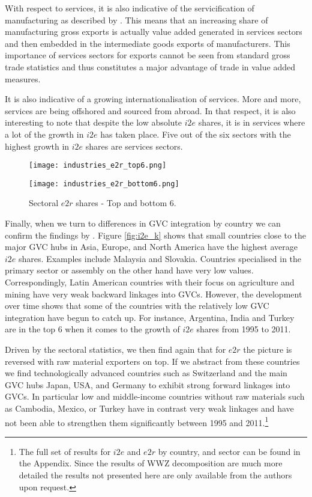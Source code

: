 \documentclass[11pt,a4paper]{article}
\begin{document}
With respect to services, it is also indicative of the servicification of manufacturing as described by \citet{ribaetal15}. This means that an increasing share of manufacturing gross exports is actually value added generated in services sectors and then embedded in the intermediate goods exports of manufacturers. This importance of services sectors for exports cannot be seen from standard gross trade statistics and thus constitutes a major advantage of trade in value added measures. 

It is also indicative of a growing internationalisation of services. More and more, services are being offshored and sourced from abroad. In that respect, it is also interesting to note that despite the low absolute $i2e$ shares, it is in services where a lot of the growth in $i2e$ has taken place. Five out of the six sectors with the highest growth in $i2e$ shares are services sectors.

\begin{figure}
\centering
\begin{minipage}{0.45\textwidth}
\centering
\texttt{[image: industries\_e2r\_top6.png]}
\end{minipage}\hfill
\begin{minipage}{0.45\textwidth}
\centering
\texttt{[image: industries\_e2r\_bottom6.png]}
\end{minipage}
\caption{Sectoral $e2r$ shares - Top and bottom 6.}
\label{fig:e2r_s}
\end{figure}

Finally, when we turn to differences in GVC integration by country we can confirm the findings by \citet{ribajalo13}. Figure \ref{fig:i2e_k} shows that small countries close to the major GVC hubs in Asia, Europe, and North America have the highest average $i2e$ shares. Examples include Malaysia and Slovakia. Countries specialised in the primary sector or assembly on the other hand have very low values. Correspondingly, Latin American countries with their focus on agriculture and mining have very weak backward linkages into GVCs. However, the development over time shows that some of the countries with the relatively low GVC integration have begun to catch up. For instance, Argentina, India and Turkey are in the top 6 when it comes to the growth of $i2e$ shares from 1995 to 2011.

Driven by the sectoral statistics, we then find again that for $e2r$ the picture is reversed with raw material exporters on top. If we abstract from these countries we find technologically advanced countries such as Switzerland and the main GVC hubs Japan, USA, and Germany to exhibit strong forward linkages into GVCs. In particular low and middle-income countries without raw materials such as Cambodia, Mexico, or Turkey have in contrast very weak linkages and have not been able to strengthen them significantly between 1995 and 2011.\footnote{The full set of results for $i2e$ and $e2r$ by country, and sector can be found in the Appendix. Since the results of WWZ decomposition are much more detailed the results not presented here are only available from the authors upon request.}
\end{document}
